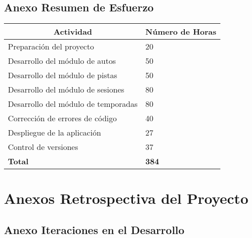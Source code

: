 \subsection{Anexo Resumen de Esfuerzo}
\begin{center}
  \begin{tabular}{ | p{10cm} | p{5cm} |}
    \hline
    \multicolumn{1}{|c|}{\textbf{Actividad}} & \multicolumn{1}{|c|}{\textbf{Número de Horas}} \\
    \hline
    
    {Preparación del proyecto} & {20} \\ \hline
    {Desarrollo del módulo de autos} & {50} \\ \hline
    {Desarrollo del módulo de pistas} & {50} \\ \hline
    {Desarrollo del módulo de sesiones} & {80} \\ \hline
    {Desarrollo del módulo de temporadas} & {80} \\ \hline
    {Corrección de errores de código} & {40} \\ \hline
    {Despliegue de la aplicación} & {27} \\ \hline
    {Control de versiones} & {37} \\ \hline
    
    {\textbf{Total}} & {\textbf{384}} \\

    \hline
  \end{tabular}
  
    \label{table:effort}
\end{center}

\newpage

\section{Anexos Retrospectiva del Proyecto}

\subsection{Anexo Iteraciones en el Desarrollo}

